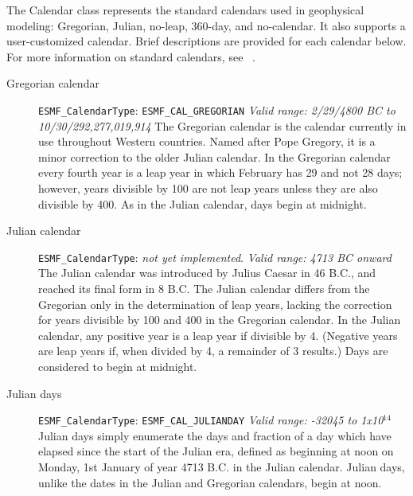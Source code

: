 
\label{sec:Calendar}
The Calendar class represents the standard calendars used in 
geophysical modeling:  Gregorian, Julian, no-leap, 360-day, and 
no-calendar.  It also supports a user-customized calendar.  Brief 
descriptions are provided for each calendar below.  For more information 
on standard calendars, see ~\cite{seidelman}.

\begin{description}            
\item[Gregorian calendar]  
{\tt ESMF\_CalendarType}: {\tt ESMF\_CAL\_GREGORIAN} \newline
{\it Valid range: 2/29/4800 BC to 10/30/292,277,019,914 } \newline
The Gregorian calendar is the calendar currently in use throughout Western
countries.  Named after Pope Gregory, it is a minor 
correction to the older Julian calendar. In the Gregorian calendar every
fourth year is a leap year in which February has 29 and not 28 days;
however, years divisible by 100 are not leap years unless they are also 
divisible  by 400.  As in the Julian calendar, days begin at midnight.

\item[Julian calendar]
{\tt ESMF\_CalendarType}:  {\it not yet implemented}. \newline
{\it Valid range: 4713 BC onward} \newline
The Julian calendar was introduced by Julius Caesar in 46 B.C., and 
reached its final form in 8 B.C.  The Julian calendar differs from the 
Gregorian only in the determination of leap years, lacking the correction 
for years divisible
by 100 and 400 in the Gregorian calendar. In the Julian calendar, any positive 
year is a leap year if divisible by 4. (Negative years are leap years if, when 
divided by 4, a remainder of 3 results.) Days are considered to begin at 
midnight.

\item[Julian days]
{\tt ESMF\_CalendarType}:  {\tt ESMF\_CAL\_JULIANDAY} \newline
{\it Valid range: -32045 to 1x10$^{14}$} \newline
Julian days simply enumerate the days and fraction of a day which have elapsed 
since the start of the Julian era, defined as beginning at noon on Monday, 
1st January of year 4713 B.C. in the Julian calendar.  Julian days, 
unlike the dates in the Julian and Gregorian calendars, begin at noon.


\end{description}
